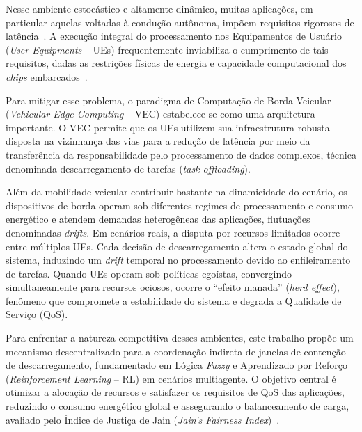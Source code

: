 \documentclass[iicol]{sn-jnl}
\begin{document}
Nesse ambiente estocástico e altamente dinâmico, muitas aplicações, em particular aquelas voltadas à condução autônoma, impõem requisitos rigorosos de latência~\cite{chao2025}. A execução integral do processamento nos Equipamentos de Usuário (\textit{User Equipments} -- UEs) frequentemente inviabiliza o cumprimento de tais requisitos, dadas as restrições físicas de energia e capacidade computacional dos \textit{chips} embarcados~\cite{luo2024}.

Para mitigar esse problema, o paradigma de Computação de Borda Veicular (\textit{Vehicular Edge Computing} -- VEC) estabelece-se como uma arquitetura importante. O VEC permite que os UEs utilizem sua infraestrutura robusta disposta na vizinhança das vias para a redução de latência por meio da transferência da responsabilidade pelo processamento de dados complexos, técnica denominada descarregamento de tarefas (\textit{task offloading}).

Além da mobilidade veicular contribuir bastante na dinamicidade do cenário, os dispositivos de borda operam sob diferentes regimes de processamento e consumo energético e atendem demandas heterogêneas das aplicações, flutuações denominadas \textit{drifts}. Em cenários reais, a disputa por recursos limitados ocorre entre múltiplos UEs. Cada decisão de descarregamento altera o estado global do sistema, induzindo um \textit{drift} temporal no processamento devido ao enfileiramento de tarefas. Quando UEs operam sob políticas egoístas, convergindo simultaneamente para recursos ociosos, ocorre o ``efeito manada'' (\textit{herd effect}), fenômeno que compromete a estabilidade do sistema e degrada a Qualidade de Serviço (QoS).


Para enfrentar a natureza competitiva desses ambientes, este trabalho propõe um mecanismo descentralizado para a coordenação indireta de janelas de contenção de descarregamento, fundamentado em Lógica \textit{Fuzzy} e Aprendizado por Reforço (\textit{Reinforcement Learning} -- RL) em cenários multiagente. O objetivo central é otimizar a alocação de recursos e satisfazer os requisitos de QoS das aplicações, reduzindo o consumo energético global e assegurando o balanceamento de carga, avaliado pelo Índice de Justiça de Jain (\textit{Jain's Fairness Index})~\cite{jain1984quantitative}.
\end{document}
